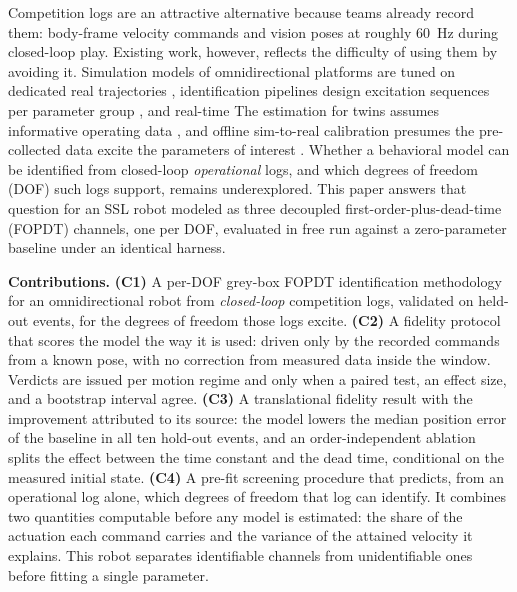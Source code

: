 Competition logs are an attractive alternative because teams already record them: body-frame velocity commands and vision poses at roughly \SI{60}{Hz} during closed-loop play. Existing work, however, reflects the difficulty of using them by avoiding it. Simulation models of omnidirectional platforms are
tuned on dedicated real trajectories \cite{wiedemann2024simulation,wiedemann2025automated}, identification pipelines design excitation sequences per parameter group \cite{giro2023otbot}, and real-time
The estimation for twins assumes informative operating data \cite{kosmaga2026digital}, and offline sim-to-real calibration presumes the pre-collected data excite the parameters of interest \cite{tiboni2023dropo}. Whether a behavioral model can be identified from closed-loop \emph{operational} logs, and which degrees of freedom (DOF) such logs support, remains underexplored. This paper answers that question for an SSL robot modeled as three decoupled first-order-plus-dead-time (FOPDT) channels, one per DOF, evaluated in  free run against a zero-parameter baseline under an identical harness.

\noindent\textbf{Contributions.}
\textbf{(C1)} A per-DOF grey-box FOPDT identification methodology for an omnidirectional robot from \emph{closed-loop} competition logs, validated on held-out events, for the degrees of freedom those logs excite. 
\textbf{(C2)} A fidelity protocol that scores the model the way it is used: driven only by the recorded commands from a known pose, with no correction from measured data inside the window. Verdicts are issued per motion regime and only when a paired test, an effect size, and a bootstrap interval agree.
\textbf{(C3)} A translational fidelity result with the improvement attributed to its source: the model lowers the median position error of the baseline in all ten hold-out events, and an order-independent ablation splits the effect between the time constant and the dead time, conditional on the measured initial state.
\textbf{(C4)} A pre-fit screening procedure that predicts, from an operational log alone, which degrees of freedom that log can identify. It combines two quantities computable before any model is estimated: the share of the actuation each command carries and the variance of the attained velocity it explains. This robot separates identifiable channels from unidentifiable ones before fitting a single parameter.
